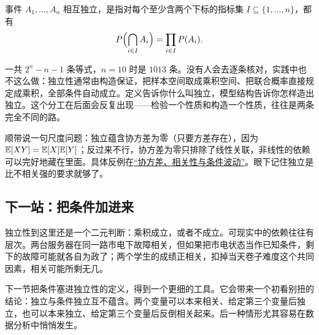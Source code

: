 \begin{definition}
事件 \(A_1,\ldots,A_n\) 相互独立，是指对每个至少含两个下标的指标集 \(I\subseteq\{1,\ldots,n\}\)，都有
\[
P\Bigl(\bigcap_{i\in I}A_i\Bigr)=\prod_{i\in I}P(A_i).
\]
\end{definition}

一共 \(2^n-n-1\) 条等式，\(n=10\) 时是 \(1013\) 条。没有人会去逐条核对，实践中也不这么做：独立性通常由构造保证，把样本空间取成乘积空间、把联合概率直接规定成乘积，全部条件自动成立。定义告诉你什么叫独立，模型结构告诉你怎样造出独立。这个分工在后面会反复出现——检验一个性质和构造一个性质，往往是两条完全不同的路。

顺带说一句尺度问题：独立蕴含协方差为零（只要方差存在），因为 \(\mathbb{E}[XY]=\mathbb{E}[X]\mathbb{E}[Y]\)；反过来不行，协方差为零只排除了线性关联，非线性的依赖可以完好地藏在里面。具体反例在\hyperref[sec:05-Probability/04-Expectation-and-Moments/03]{``协方差、相关性与条件波动''}。眼下记住独立是比不相关强的要求就够了。

\subsection{下一站：把条件加进来}

独立性到这里还是一个二元判断：乘积成立，或者不成立。可现实中的依赖往往有层次。两台服务器在同一路市电下故障相关，但如果把市电状态当作已知条件，剩下的故障可能就各自为政了；两个学生的成绩正相关，扣掉当天卷子难度这个共同因素，相关可能所剩无几。

下一节把条件塞进独立性的定义，得到一个更细的工具。它会带来一个初看别扭的结论：独立与条件独立互不蕴含。两个变量可以本来相关、给定第三个变量后独立，也可以本来独立、给定第三个变量后反倒相关起来。后一种情形尤其容易在数据分析中悄悄发生。
